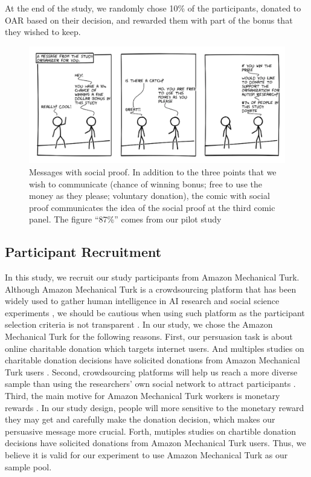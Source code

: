 At the end of the study, we randomly chose 10\% of the participants, donated to OAR based on their decision, and rewarded them with part of the bonus that they wished to keep.




\begin{figure}[bt]
    \centering
    \includegraphics[width=\columnwidth]{./figures/social_proof.png}
    \caption{Messages with social proof. In addition to the three points that we wish to communicate (chance of winning bonus; free to use the money as they please; voluntary donation), the comic with social proof communicates the idea of the social proof at the third comic panel. The figure ``87\%'' comes from our pilot study}
    \label{fig:basic three comic social proof}
\end{figure}



\subsection{Participant Recruitment}
\label{sub:Participant Recruitment}
In this study, we recruit our study participants from Amazon Mechanical Turk. Although Amazon Mechanical Turk is a crowdsourcing platform that has been widely used to gather human intelligence in AI research and social science experiments \cite{ paolacci2014inside,berinsky2012evaluating,buhrmester2011amazon,branas2018gender,lee2013does,saunders2016no,arechar2017turking,sussman2015framing}, we should be cautious when using such platform as the participant selection criteria is not transparent \cite{landers2015inconvenient,paolacci2010running}. In our study, we chose the Amazon Mechanical Turk for the following reasons. First, our persuasion task is about online charitable donation which targets internet users. And multiples studies on charitable donation decisions have solicited donations from Amazon Mechanical Turk users \cite{branas2018gender,lee2013does,saunders2016no,arechar2017turking,sussman2015framing}. Second, crowdsourcing platforms will help us reach a more diverse sample than using the researchers' own social network to attract participants \cite{buhrmester2011amazon}. Third, the main motive for Amazon Mechanical Turk workers is monetary rewards \cite{berinsky2012evaluating}. In our study design, people will more sensitive to the monetary reward they may get and carefully make the donation decision, which makes our persuasive message more crucial. Forth, mutiples studies on chartible donation decisions have solicited donations from Amazon Mechanical Turk users. Thus, we believe it is valid for our experiment to use Amazon Mechanical Turk as our sample pool. 

